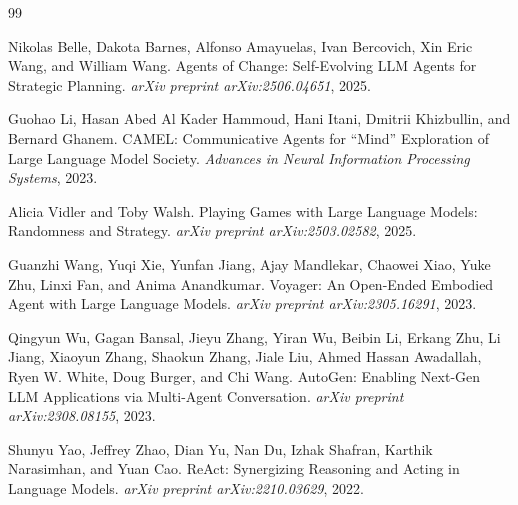 \documentclass{article} %
\begin{document}
\begin{thebibliography}{99}

Nikolas Belle, Dakota Barnes, Alfonso Amayuelas, Ivan Bercovich, Xin Eric Wang, and William Wang.
Agents of Change: Self-Evolving LLM Agents for Strategic Planning.
\textit{arXiv preprint arXiv:2506.04651}, 2025.

Guohao Li, Hasan Abed Al Kader Hammoud, Hani Itani, Dmitrii Khizbullin, and Bernard Ghanem.
CAMEL: Communicative Agents for ``Mind'' Exploration of Large Language Model Society.
\textit{Advances in Neural Information Processing Systems}, 2023.

Alicia Vidler and Toby Walsh.
Playing Games with Large Language Models: Randomness and Strategy.
\textit{arXiv preprint arXiv:2503.02582}, 2025.

Guanzhi Wang, Yuqi Xie, Yunfan Jiang, Ajay Mandlekar, Chaowei Xiao, Yuke Zhu, Linxi Fan, and Anima Anandkumar.
Voyager: An Open-Ended Embodied Agent with Large Language Models.
\textit{arXiv preprint arXiv:2305.16291}, 2023.

Qingyun Wu, Gagan Bansal, Jieyu Zhang, Yiran Wu, Beibin Li, Erkang Zhu, Li Jiang, Xiaoyun Zhang, Shaokun Zhang, Jiale Liu, Ahmed Hassan Awadallah, Ryen W. White, Doug Burger, and Chi Wang.
AutoGen: Enabling Next-Gen LLM Applications via Multi-Agent Conversation.
\textit{arXiv preprint arXiv:2308.08155}, 2023.

Shunyu Yao, Jeffrey Zhao, Dian Yu, Nan Du, Izhak Shafran, Karthik Narasimhan, and Yuan Cao.
ReAct: Synergizing Reasoning and Acting in Language Models.
\textit{arXiv preprint arXiv:2210.03629}, 2022.

\end{thebibliography}
\end{document}
